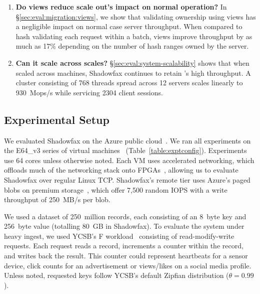 \begin{enumerate}
\item {\bf Do views reduce scale out's impact on normal operation?}
  In \S\ref{sec:eval:migration:views}, we show that validating ownership
  using views has a negligible impact on normal case server throughput.
%
  When compared to hash validating each request within a batch, views
  improve throughput by as much as 17\% depending on the number of hash
  ranges owned by the server.

\item {\bf Can it scale across scales?}
  \S\ref{sec:eval:system-scalability} shows that when scaled across
  machines, Shadowfax continues to retain \faster's high throughput.
%
  A cluster consisting of 768 threads spread across 12 servers scales
  linearly to 930~Mops/s while servicing 2304 client sessions.

\end{enumerate}

%

\subsection{Experimental Setup}

We evaluated Shadowfax on the Azure public cloud~\cite{azure}.
%
We ran all experiments on the E64\_v3 series of virtual
machines~\cite{e64} (Table~\ref{table:exptconfig}).
%
Experiments use 64 cores unless otherwise noted.
%
Each VM uses accelerated networking, which offloads
much of the networking stack onto FPGAs~\cite{accel-nw}, allowing us to
evaluate Shadowfax over regular Linux TCP.
%
Shadowfax's remote tier uses Azure's paged blobs on premium
storage~\cite{page-blobs}, which offer 7,500 random IOPS with a write
throughput of 250~MB/s per blob.

We used a dataset of 250~million records, each consisting of
an 8~byte key and 256~byte value (totalling 80~GB in Shadowfax).
%
To evaluate the system under heavy ingest, we used YCSB's F
workload~\cite{ycsb} consisting of read-modify-write requests.
%
Each request reads a record, increments a counter within the record, and
writes back the result.
%
This counter could represent heartbeats for a sensor device, click
counts for an advertisement or views/likes on a social media profile.
%
Unless noted, requested keys follow YCSB's default Zipfian distribution ($\theta = 0.99$).

